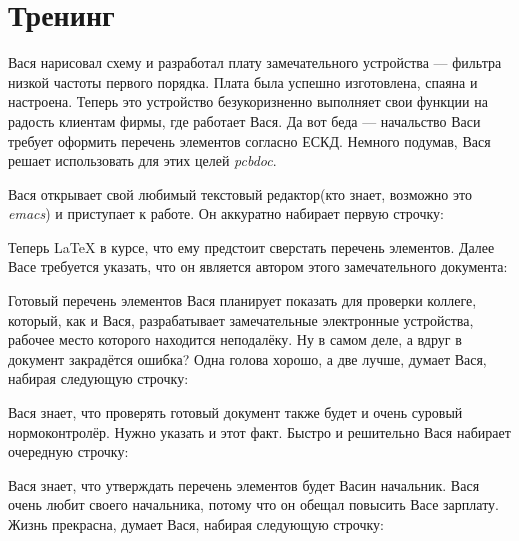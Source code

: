 
\section{Тренинг}

Вася нарисовал схему и разработал плату замечательного устройства --- фильтра
низкой частоты первого порядка. Плата была успешно изготовлена, спаяна и
настроена. Теперь это устройство безукоризненно выполняет свои функции на радость
клиентам фирмы, где работает Вася. Да вот беда --- начальство Васи требует
оформить перечень элементов согласно ЕСКД. Немного подумав, Вася решает
использовать для этих целей \emph{pcbdoc}.

Вася открывает свой любимый текстовый редактор(кто знает, возможно это
\emph{emacs}) и приступает к работе. Он аккуратно набирает первую строчку:


Теперь \LaTeX{} в курсе, что ему предстоит сверстать перечень элементов.
Далее Васе требуется указать, что он является автором этого замечательного
документа:

\begin{pcbdoccode}
\end{pcbdoccode}

Готовый перечень элементов Вася планирует показать для проверки коллеге, который,
как и Вася, разрабатывает замечательные электронные устройства, рабочее место
которого находится неподалёку. Ну в самом деле, а вдруг в документ закрадётся
ошибка? Одна голова хорошо, а две лучше, думает Вася, набирая следующую
строчку:

\begin{pcbdoccode}
\end{pcbdoccode}

Вася знает, что проверять готовый документ также будет и очень суровый
нормоконтролёр. Нужно указать и этот факт. Быстро и решительно Вася набирает
очередную строчку:

\begin{pcbdoccode}
\end{pcbdoccode}

Вася знает, что утверждать перечень элементов будет Васин начальник. Вася очень
любит своего начальника, потому что он обещал повысить Васе зарплату. Жизнь
прекрасна, думает Вася, набирая следующую строчку:

